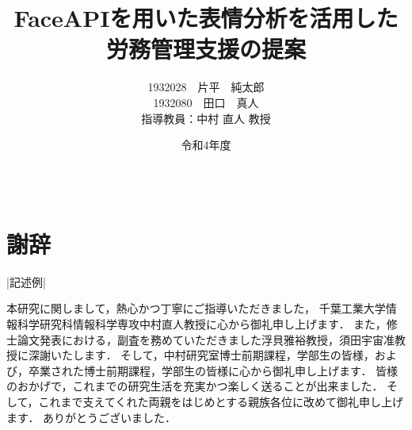 \documentclass[12pt]{ltjsreport}%
\title{FaceAPIを用いた表情分析を活用した\\労務管理支援の提案}					%
\author{1932028　片平　純太郎\\1932080　田口　真人\\\normalsize 指導教員：中村 直人 教授}	%
\date{令和4年度}                                %
\begin{document}
\maketitle                          %
\tableofcontents                 %
\listoffigures				 %
\listoftables				 %

\baselineskip 20pt               %


\clearpage
{}


%










\newpage



\chapter*{　\\謝辞}
|記述例|

本研究に関しまして，熱心かつ丁寧にご指導いただきました，
千葉工業大学情報科学研究科情報科学専攻中村直人教授に心から御礼申し上げます．
また，修士論文発表における，副査を務めていただきました浮貝雅裕教授，須田宇宙准教授に深謝いたします．
そして，中村研究室博士前期課程，学部生の皆様，および，卒業された博士前期課程，学部生の皆様に心から御礼申し上げます．
皆様のおかげで，これまでの研究生活を充実かつ楽しく送ることが出来ました．
そして，これまで支えてくれた両親をはじめとする親族各位に改めて御礼申し上げます．
ありがとうございました．

\end{document}
